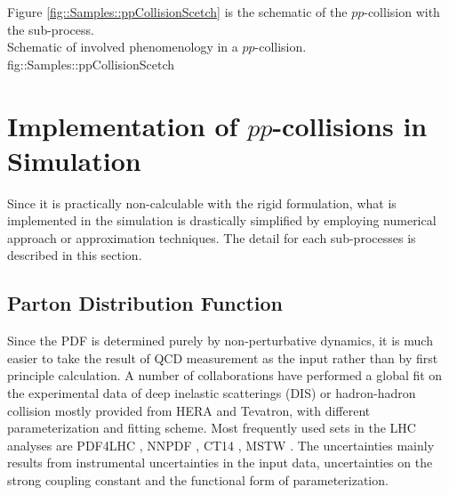Figure \ref{fig::Samples::ppCollisionScetch} is the schematic of the $pp$-collision with the sub-process.  \\



{Schematic of involved phenomenology in a $pp$-collision.}
{fig::Samples::ppCollisionScetch}


\section{Implementation of $pp$-collisions in Simulation}
Since it is practically non-calculable with the rigid formulation, 
what is implemented in the simulation is drastically simplified by employing numerical approach or approximation techniques. The detail for each sub-processes is described in this section. \\


\subsection{Parton Distribution Function}
Since the PDF is determined purely by non-perturbative dynamics, 
it is much easier to take the result of QCD measurement as the input rather than by first principle calculation.
A number of collaborations have performed 
a global fit on the experimental data of deep inelastic scatterings (DIS) or hadron-hadron collision mostly provided from HERA and Tevatron, with different parameterization and fitting scheme. 
Most frequently used sets in the LHC analyses are PDF4LHC \cite{PDF4LHC}, NNPDF \cite{NNPDF}, CT14 \cite{CT14}, MSTW \cite{MSTW}.
The uncertainties mainly results from instrumental uncertainties in the input data, uncertainties on the strong coupling constant and the functional form of parameterization.  \\


